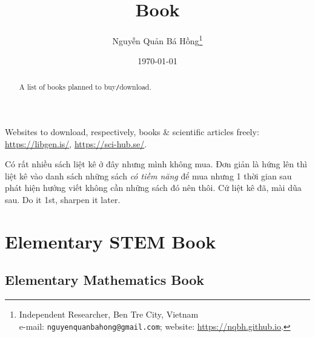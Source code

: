 \documentclass{article}
\title{Book}
\author{Nguyễn Quản Bá Hồng\footnote{Independent Researcher, Ben Tre City, Vietnam\\e-mail: \texttt{nguyenquanbahong@gmail.com}; website: \url{https://nqbh.github.io}.}}
\date{\today}
\begin{document}
\maketitle
\begin{abstract}
	A list of books planned to buy\texttt{/}download.
\end{abstract}
\tableofcontents
\newpage


\textsf{Websites to download, respectively, books \& scientific articles freely:} \url{https://libgen.is/}, \url{https://sci-hub.se/}.

Có rất nhiều sách liệt kê ở đây nhưng mình không mua. Đơn giản là hứng lên  thì liệt kê vào danh sách những sách \emph{có tiềm năng} để mua nhưng 1 thời gian sau phát hiện hướng viết không cần những sách đó nên thôi. Cứ liệt kê đã, mài dũa sau. Do it 1st, sharpen it later.

\section{Elementary STEM Book}

\subsection{Elementary Mathematics Book}
\end{document}
